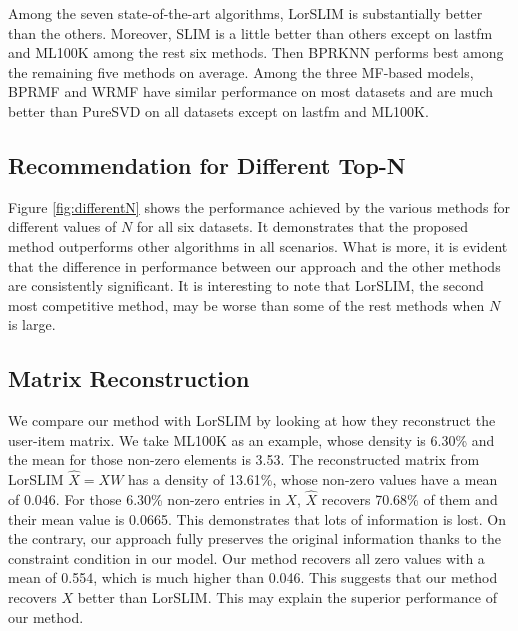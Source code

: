 \documentclass[letterpaper]{article}
\begin{document}
Among the seven state-of-the-art algorithms, LorSLIM is substantially better than the others. Moreover, SLIM is a little better than others except on lastfm and ML100K among the rest six methods. Then BPRKNN performs best among the remaining five methods on average.  Among the three MF-based models, BPRMF and WRMF have similar performance on most datasets and are much better than PureSVD on all datasets except on lastfm and ML100K.
\subsection{Recommendation for Different Top-N}

Figure \ref{fig:differentN} shows the performance achieved by the various methods for different values of $N$ for all six datasets. It demonstrates that the proposed method outperforms other algorithms in all scenarios. What is more, it is evident that the difference in performance between our approach and the other methods are consistently significant. It is interesting to note that LorSLIM, the second most competitive method, may be worse than some of the rest methods when $N$ is large.
\subsection{Matrix Reconstruction}
We compare our method with LorSLIM by looking at how they reconstruct the user-item matrix. We take ML100K as an example, whose density is 6.30\% and the mean for those non-zero elements is 3.53. The reconstructed matrix from LorSLIM $\hat{X}=XW$ has a density of 13.61\%, whose non-zero values have a mean of 0.046. For those 6.30\% non-zero entries in $X$, $\hat{X}$ recovers 70.68\% of them and their mean value is 0.0665. This demonstrates that lots of information is lost. On the contrary, our approach fully preserves the original information thanks to the constraint condition in our model. Our method recovers all zero values with a mean of 0.554, which is much higher than 0.046. This suggests that our method recovers $X$ better than LorSLIM. This may explain the superior performance of our method.
\end{document}
